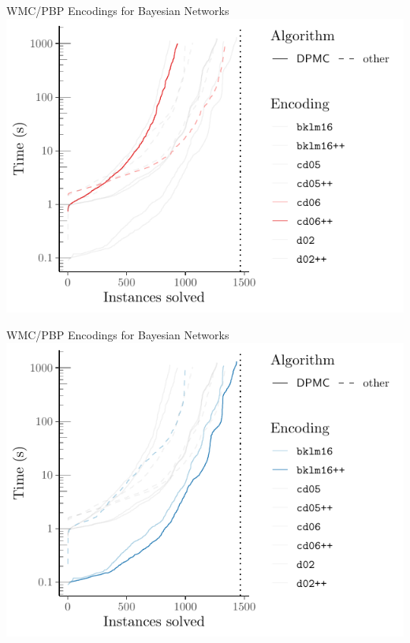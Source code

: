 \documentclass{beamer}
\begin{document}
\begin{frame}{WMC/PBP Encodings for Bayesian Networks}
  \centering
  \includegraphics[width=\textwidth]{cumulative3}
\end{frame}

\begin{frame}{WMC/PBP Encodings for Bayesian Networks}
  \centering
  \includegraphics[width=\textwidth]{cumulative4}
\end{frame}
\end{document}
